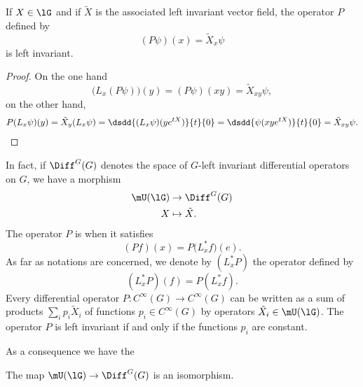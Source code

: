 \begin{lemma}
	If $X\in\lG$ and if $\tilde X$ is the associated left invariant vector field, the operator $P$ defined by
	\begin{equation}
		(P\psi)(x)=\tilde X_{x}\psi
	\end{equation}
	is left invariant.
\end{lemma}

\begin{proof}
	On the one hand
	\[
		\big( L_{x}(P\psi) \big)(y)=(P\psi)(xy)=\tilde X_{xy}\psi,
	\]
	on the other hand,
	\begin{equation}
		\begin{aligned}[]
			P(L_{x}\psi)(y)=\tilde X_{y}(L_{x}\psi)
			=\dsdd{ (L_{x}\psi)(y e^{tX}) }{t}{0}
			=\dsdd{ \psi(xy e^{tX}) }{t}{0}
			=\tilde X_{xy}\psi.
		\end{aligned}
	\end{equation}
\end{proof}

In fact, if $\Diff^G(G)$ denotes the space of $G$-left invariant differential operators on $G$, we have a morphism
\begin{equation}		\label{EqMorphismUgDiff}
	\begin{aligned}
		\mU(\lG) & \to \Diff^{G}(G)  \\
		X        & \mapsto \tilde X.
	\end{aligned}
\end{equation}
The operator $P$ is  when it satisfies
\begin{equation}
	(Pf)(x)=P\big( L_x^*f \big)(e).
\end{equation}
As far as notations are concerned, we denote by $(L^*_xP)$ the operator defined by
\begin{equation}
	(L^*_xP)(f)=P(L^*_xf).
\end{equation}
Every differential operator $P\colon  C^{\infty}(G)\to  C^{\infty}(G)$ can be written as a sum of products $\sum_ip_i\tilde X_i$ of functions $p_i\in C^{\infty}(G)$ by operators $\tilde X_i\in\mU(\lG)$. The operator $P$ is left invariant if and only if the functions $p_i$ are constant.

As a consequence we have the
\begin{corollary}	\label{CorUisomDiff}
	The map $\mU(\lG)\to\Diff^G(G)$ is an isomorphism.
\end{corollary}

